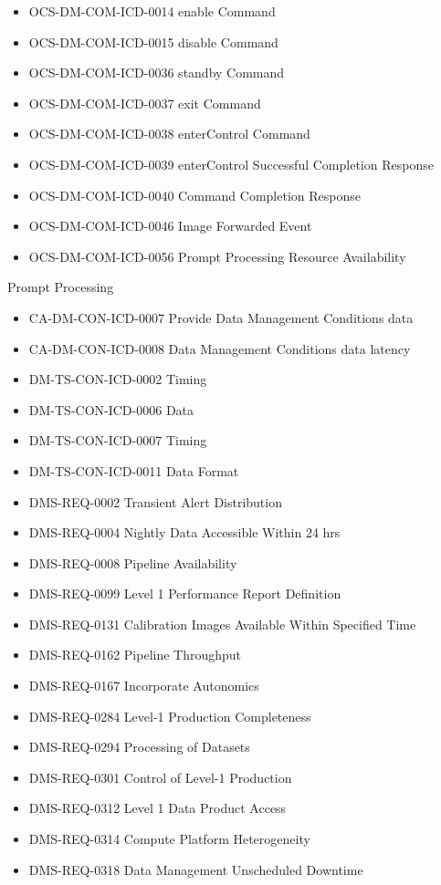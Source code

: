 \begin{itemize}
\item OCS-DM-COM-ICD-0014 enable Command
\item OCS-DM-COM-ICD-0015 disable Command
\item OCS-DM-COM-ICD-0036 standby Command
\item OCS-DM-COM-ICD-0037 exit Command
\item OCS-DM-COM-ICD-0038 enterControl Command
\item OCS-DM-COM-ICD-0039 enterControl Successful Completion Response
\item OCS-DM-COM-ICD-0040 Command Completion Response
\item OCS-DM-COM-ICD-0046 Image Forwarded Event
\item OCS-DM-COM-ICD-0056 Prompt Processing Resource Availability
\end{itemize}
Prompt Processing \begin{itemize}
\item CA-DM-CON-ICD-0007 Provide Data Management Conditions data
\item CA-DM-CON-ICD-0008 Data Management Conditions data latency
\item DM-TS-CON-ICD-0002 Timing
\item DM-TS-CON-ICD-0006 Data
\item DM-TS-CON-ICD-0007 Timing
\item DM-TS-CON-ICD-0011 Data Format
\item DMS-REQ-0002 Transient Alert Distribution
\item DMS-REQ-0004 Nightly Data Accessible Within 24 hrs
\item DMS-REQ-0008 Pipeline Availability
\item DMS-REQ-0099 Level 1 Performance Report Definition
\item DMS-REQ-0131 Calibration Images Available Within Specified Time
\item DMS-REQ-0162 Pipeline Throughput
\item DMS-REQ-0167 Incorporate Autonomics
\item DMS-REQ-0284 Level-1 Production Completeness
\item DMS-REQ-0294 Processing of Datasets
\item DMS-REQ-0301 Control of Level-1 Production
\item DMS-REQ-0312 Level 1 Data Product Access
\item DMS-REQ-0314 Compute Platform Heterogeneity
\item DMS-REQ-0318 Data Management Unscheduled Downtime

\end{itemize}
